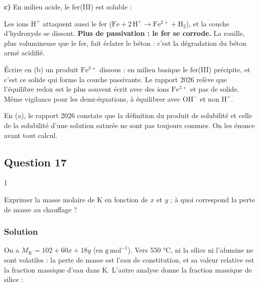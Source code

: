 \documentclass[11pt,a4paper]{article}
\newcommand{\equationajustee}[1]{%
  \sbox{\boiteequation}{$\displaystyle #1$}%
  \ifdim\wd\boiteequation>\linewidth
    \[\resizebox{\linewidth}{!}{\usebox{\boiteequation}}\]%
  \else
    \[#1\]%
  \fi}
\begin{document}
\textbf{c)} En milieu acide, le fer(III) est soluble :

\equationajustee{4\,\mathrm{Fe}+3\,\mathrm{O_2}+12\,\mathrm{H^+}\to4\,\mathrm{Fe^{3+}}+6\,\mathrm{H_2O}}

Les ions \(\mathrm{H^+}\) attaquent aussi le fer (\(\mathrm{Fe}+2\,\mathrm{H^+}\to\mathrm{Fe^{2+}}+\mathrm{H_2}\)), et la couche d'hydroxyde se dissout. \textbf{Plus de passivation : le fer se corrode.} La rouille, plus volumineuse que le fer, fait éclater le béton : c'est la dégradation du béton armé acidifié.

\begin{piege}

Écrire en (b) un produit \(\mathrm{Fe^{3+}}\) dissous : en milieu basique le fer(III) précipite, et c'est ce solide qui forme la couche passivante. Le rapport 2026 relève que l'équilibre redox est le plus souvent écrit avec des ions \(\mathrm{Fe^{3+}}\) et pas de solide. Même vigilance pour les demi-équations, à équilibrer avec \(\mathrm{OH^-}\) et non \(\mathrm{H^+}\).

\end{piege}

\begin{jury}

En (a), le rapport 2026 constate que la définition du produit de solubilité et celle de la solubilité d'une solution saturée ne sont pas toujours connues. On les énonce avant tout calcul.

\end{jury}

\hypertarget{question-17}{%
\subsection{Question 17}\label{question-17}}

\begin{indication}{1}

Exprimer la masse molaire de K en fonction de \(x\) et \(y\) ; à quoi correspond la perte de masse au chauffage ?

\end{indication}

\hypertarget{solution-16}{%
\subsubsection{Solution}\label{solution-16}}

On a \(M_K=102+60x+18y\) (en \(\mathrm{g\,mol^{-1}}\)). Vers 550 °C, ni la silice ni l'alumine ne sont volatiles : la perte de masse est l'eau de constitution, et sa valeur relative est la fraction massique d'eau dans K. L'autre analyse donne la fraction massique de silice :
\end{document}
